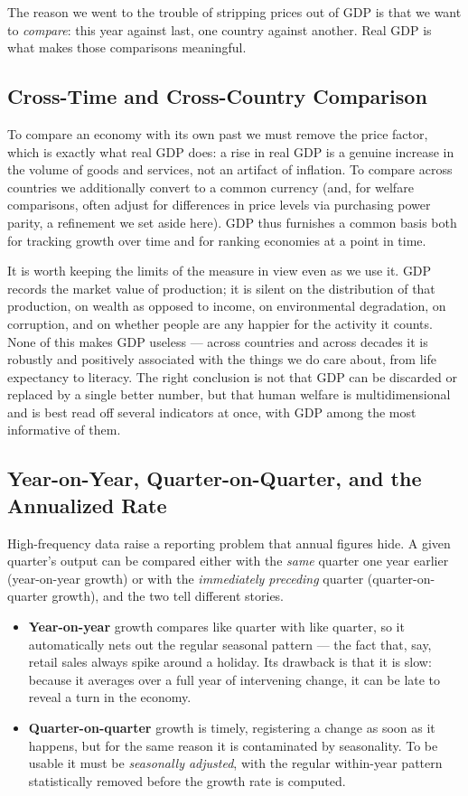 The reason we went to the trouble of stripping prices out of GDP is that we want to \emph{compare}: this year against last, one country against another. Real GDP is what makes those comparisons meaningful.

\subsection{Cross-Time and Cross-Country Comparison}

To compare an economy with its own past we must remove the price factor, which is exactly what real GDP does: a rise in real GDP is a genuine increase in the volume of goods and services, not an artifact of inflation. To compare across countries we additionally convert to a common currency (and, for welfare comparisons, often adjust for differences in price levels via purchasing power parity, a refinement we set aside here). GDP thus furnishes a common basis both for tracking growth over time and for ranking economies at a point in time.

It is worth keeping the limits of the measure in view even as we use it. GDP records the market value of production; it is silent on the distribution of that production, on wealth as opposed to income, on environmental degradation, on corruption, and on whether people are any happier for the activity it counts. None of this makes GDP useless --- across countries and across decades it is robustly and positively associated with the things we do care about, from life expectancy to literacy. The right conclusion is not that GDP can be discarded or replaced by a single better number, but that human welfare is multidimensional and is best read off several indicators at once, with GDP among the most informative of them.

\subsection{Year-on-Year, Quarter-on-Quarter, and the Annualized Rate}

High-frequency data raise a reporting problem that annual figures hide. A given quarter's output can be compared either with the \emph{same} quarter one year earlier (year-on-year growth) or with the \emph{immediately preceding} quarter (quarter-on-quarter growth), and the two tell different stories.

\begin{itemize}
    \item \textbf{Year-on-year} growth compares like quarter with like quarter, so it automatically nets out the regular seasonal pattern --- the fact that, say, retail sales always spike around a holiday. Its drawback is that it is slow: because it averages over a full year of intervening change, it can be late to reveal a turn in the economy.
    \item \textbf{Quarter-on-quarter} growth is timely, registering a change as soon as it happens, but for the same reason it is contaminated by seasonality. To be usable it must be \emph{seasonally adjusted}, with the regular within-year pattern statistically removed before the growth rate is computed.
\end{itemize}

